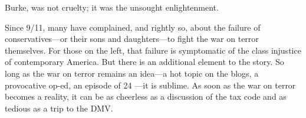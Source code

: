 Burke, was not cruelty; it was the unsought enlightenment.{\par} Since 9/11, many have complained, and rightly so, about the failure of conservatives—or their sons and daughters—to fight the war on terror themselves. For those on the left, that failure is symptomatic of the class injustice of contemporary America. But there is an additional element to the story. So long as the war on terror remains an idea—a hot topic on the blogs, a provocative op-ed, an episode of {\color{blue} 24 } —it is sublime. As soon as the war on terror becomes a reality, it can be as cheerless as a discussion of the tax code and as tedious as a trip to the DMV.{\par}